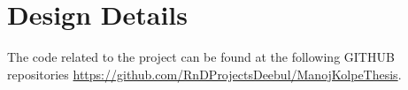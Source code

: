 


    \chapter{Design Details}
    
    The code related to the project can be found at the following GITHUB repositories \url{https://github.com/RnDProjectsDeebul/ManojKolpeThesis}. 
    
